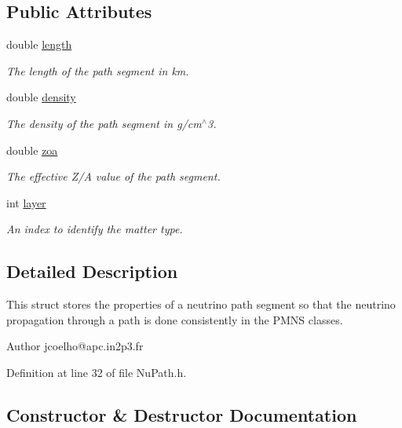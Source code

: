 \subsection*{Public Attributes}
\begin{DoxyCompactItemize}
\item 
double \hyperlink{structOscProb_1_1NuPath_af22660894b6e25cf835500381b155557}{length}
\begin{DoxyCompactList}\small\item\em The length of the path segment in km. \end{DoxyCompactList}\item 
double \hyperlink{structOscProb_1_1NuPath_a54ddd451db69bc54434de3cf18a117ca}{density}
\begin{DoxyCompactList}\small\item\em The density of the path segment in g/cm$^\wedge$3. \end{DoxyCompactList}\item 
double \hyperlink{structOscProb_1_1NuPath_af3213f3691ba83c6bc05f4a3490f6b31}{zoa}
\begin{DoxyCompactList}\small\item\em The effective Z/A value of the path segment. \end{DoxyCompactList}\item 
int \hyperlink{structOscProb_1_1NuPath_a442b160899e554ad1d800989510d5309}{layer}
\begin{DoxyCompactList}\small\item\em An index to identify the matter type. \end{DoxyCompactList}\end{DoxyCompactItemize}


\subsection{Detailed Description}
This struct stores the properties of a neutrino path segment so that the neutrino propagation through a path is done consistently in the P\+M\+NS classes.

\begin{DoxyAuthor}{Author}
jcoelho@apc.\+in2p3.\+fr 
\end{DoxyAuthor}


Definition at line 32 of file Nu\+Path.\+h.



\subsection{Constructor \& Destructor Documentation}
